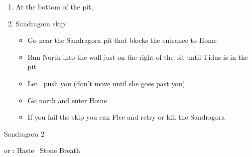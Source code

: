 \begin{enumerate}[resume]
	\item At the bottom of the pit, 
	\item Sandragora skip:
		\begin{itemize}
			\item Go near the Sandragora pit that blocks the entrance to Home
			\item Run North into the wall just on the right of the pit until Tidus is in the pit
			\item Let \rikku\ push you (don't move until she goes past you)
			\item Go north and enter Home
			\item If you fail the skip you can Flee and retry or kill the Sandragora
		\end{itemize}
\end{enumerate}
\begin{battle}{Sandragora 2}
	\begin{itemize}
		\switch{\tidus}{\kimahri} or \tidus: Haste \kimahri
		\kimahrif \od\ Stone Breath
	\end{itemize}
\end{battle}
\begin{enumerate}[resume]
	\blitzballdetermination[true]{
		\item \formation{\tidus}{\lulu}{\auron}
	}{
		\item \formation{\tidus}{\rikku}{\auron}
	}
\end{enumerate}
\ \lossvfill \ \lossnewline \losscb \ 
